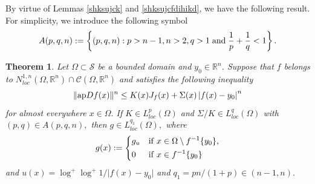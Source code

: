 \documentclass[11pt,twoside]{article}
\newtheorem{thm}{Theorem}[section]
\theoremstyle{definition}
\theoremstyle{remark}
\newcommand{\abs}[1]{\left|#1\right|}
\begin{document}
By virtue of Lemmas \ref{shksujck} and \ref{shksujcfdihikd}, we have the following result. For simplicity, we introduce the following symbol  $$A(p,q,n):=\left\{(p,q,n):p>n-1,n>2,q>1\;{\rm and}\;\frac{1}{p}+\frac{1}{q}<1\right\}.$$
\begin{thm}\label{th11000}
Let $\Omega\subset\mathcal{S}$ be a bounded domain and $y_{0}\in\mathbb{R}^{n}$. Suppose that $f$ belongs to  $N_{loc}^{1,n}(\Omega,\mathbb{R}^{n})\cap \mathcal{C}(\Omega,\mathbb{R}^{n})$ and satisfies the following inequality
\begin{equation}
\| {\rm ap}Df(x)\|^{n}\leq K(x)J_{f}(x)+\Sigma(x)\abs{f(x)-y_{0}}^{n}
\end{equation}
for almost everywhere $x\in\Omega.$ If $K\in L_{loc}^{p}(\Omega)$ and $\Sigma/K\in L_{loc}^{q}(\Omega)$ with $(p,q)\in A(p,q,n),$  then 
$g\in L_{loc}^{q_{1}}(\Omega),$ where 
\begin{equation}\label{xgaufhgjhjkkixkx}
  g(x):=\left\{
\begin{aligned}
&g_{u}   &   &    {\rm if}\;{x\in \Omega\setminus f^{-1}\{y_{0}\}},\\
&0       &      &{\rm if}\; {x\in f^{-1}\{y_{0}\}}
\end{aligned} \right.
\end{equation}
 and $u(x)=\log^{+}\log^{+}1/\vert f(x)-y_{0}\vert$ and $q_{1}=pn/(1+p)\in(n-1, n).$ 
\end{thm}
\end{document}
